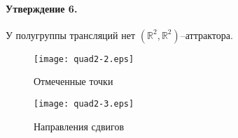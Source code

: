 \paragraph{Утверждение 6.}
У полугруппы трансляций \label{primer_R2_oper_sdviga} нет $(\mathbb{R}^2,\mathbb{R}^2)$--аттрактора.


\begin{wrapfigure}[18]{r}{7.5cm}
	\texttt{[image: quad2-2.eps]}
	\caption{Отмеченные точки}
	\label{fig:somelabel2}
\end{wrapfigure}


\begin{wrapfigure}[14]{r}{7.5cm}
	\texttt{[image: quad2-3.eps]}
	\caption{Направления сдвигов}
	\label{fig:somelabel3}
\end{wrapfigure}



